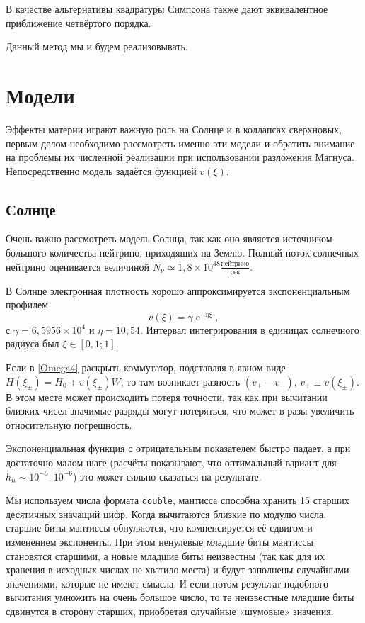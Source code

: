 \documentclass[12pt]{article}
\DeclareMathOperator{\Exp}{e}
\renewcommand\exp\Exp
\begin{document}
В качестве альтернативы квадратуры Симпсона также дают эквивалентное приближение
четвёртого порядка.

Данный метод мы и будем реализовывать.

\section{Модели}

Эффекты материи играют важную роль на Солнце и в коллапсах сверхновых, первым
делом необходимо рассмотреть именно эти модели и обратить внимание на проблемы
их численной реализации при использовании разложения Магнуса. Непосредственно
модель задаётся функцией $v(\xi)$.

\subsection{Солнце}

Очень важно рассмотреть модель Солнца, так как оно является источником большого
количества нейтрино, приходящих на Землю. Полный поток солнечных нейтрино
оценивается величиной
$N_\nu\simeq 1{,}8 \times 10^{38} \frac{\text{нейтрино}}{\text{сек}}$.

В Солнце электронная плотность хорошо аппроксимируется экспоненциальным профилем
\begin{equation}
  v(\xi)=\gamma \exp^{-\eta\xi},
\end{equation}
с $\gamma=6{,}5956\times10^4$ и $\eta=10{,}54$. Интервал интегрирования в
единицах солнечного радиуса был $\xi\in[0{,}1;1]$.

Если в \eqref{Omega4} раскрыть коммутатор, подставляя в явном виде
$H(\xi_\pm)=H_0+v(\xi_\pm)W$, то там возникает разность $(v_+-v_-)$,
$v_\pm\equiv v(\xi_\pm)$. В этом месте может происходить потеря точности, так
как при вычитании близких чисел значимые разряды могут потеряться, что может в
разы увеличить относительную погрешность.

Экспоненциальная функция с отрицательным показателем быстро падает, а при
достаточно малом шаге (расчёты показывают, что оптимальный вариант для
\(h_n\sim 10^{-5}\)–\(10^{-6}\)) это может сильно сказаться на результате.

Мы используем числа формата \verb|double|, мантисса способна хранить 15 старших
десятичных значащий цифр. Когда вычитаются близкие по модулю числа, старшие биты
мантиссы обнуляются, что компенсируется её сдвигом и изменением экспоненты. При
этом ненулевые младшие биты мантиссы становятся старшими, а новые младшие биты
неизвестны (так как для их хранения в исходных числах не хватило места) и будут
заполнены случайными значениями, которые не имеют смысла.
И если потом результат подобного вычитания умножить на очень
большое число, то те неизвестные младшие биты сдвинутся в сторону старших,
приобретая случайные «шумовые» значения.
\end{document}
